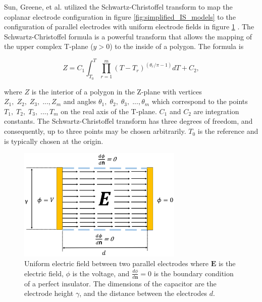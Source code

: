     \par Sun, Greene, et al. utilized the Schwartz-Christoffel transform to map the coplanar electrode configuration in figure \ref{fig:simplified_IS_models} to the configuration of parallel electrodes with uniform electrode fields in figure \ref{fig:parallelCapacitorModel} \cite{sun_analytical_2007}. The Schwartz-Christoffel formula is a powerful transform that allows the mapping of the upper complex T-plane ($y>0$) to the inside of a polygon. The formula is
    
    \begin{equation}
        Z = C_1 \int_{T_0}^T \prod^m_{r=1} (T - T_r)^{(\theta_r/\pi - 1)} dT + C_2,
    \end{equation}
    
    \noindent where $Z$ is the interior of a polygon in the Z-plane with vertices $Z_1,\;Z_2,\;Z_3,\; ...,Z_m$ and angles $\theta_1,\;\theta_2,\;\theta_3,\; ...,\theta_m$ which correspond to the points $T_1,\;T_2,\;T_3,\; ...,T_m$ on the real axis of the T-plane. $C_1$ and $C_2$ are integration constants. The Schwartz-Christoffel transform has three degrees of freedom, and consequently, up to three points may be chosen arbitrarily. $T_0$ is the reference and is typically chosen at the origin.
    
       \begin{figure}[h]
        \centering
        \includegraphics[width=0.7\textwidth]{images/capacitorNoFringe.png}
        \caption[Uniform electric field between parallel plates]{Uniform electric field between two parallel electrodes where $\boldsymbol{E}$ is the electric field, $\phi$ is the voltage, and $\frac{d\phi}{d\boldsymbol{n}}=0$ is the boundary condition of a perfect insulator. The dimensions of the capacitor are the electrode height $\gamma$, and the distance between the electrodes $d$.}
        \label{fig:parallelCapacitorModel}
  \end{figure}
    
